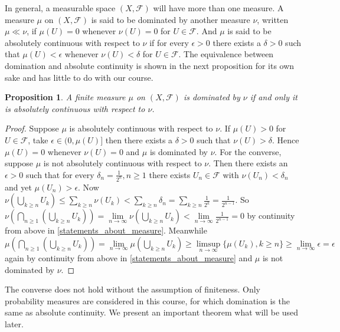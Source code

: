 \documentclass[12pt]{amsart}
\newtheorem{proposition}[theorem]{Proposition}
\theoremstyle{definition}
\begin{document}
In general, a measurable space $(X, \mathcal{F})$ will have more than one measure. A measure $\mu$ on $(X, \mathcal{F})$ is said to be dominated by another measure $\nu$, written $\mu \ll \nu$, if $\mu(U) = 0$ whenever $\nu(U) = 0$ for $U \in \mathcal{F}$. And $\mu$ is said to be absolutely continuous with respect to $\nu$ if for every $\epsilon > 0$ there exists a $\delta > 0$ such that $\mu(U) < \epsilon$ whenever $\nu(U) < \delta$ for $U \in \mathcal{F}$. The equivalence between domination and absolute continuity is shown in the next proposition for its own sake and has little to do with our course.

\begin{proposition} A finite measure $\mu$ on $(X, \mathcal{F})$ is dominated by $\nu$ if and only it is absolutely continuous with respect to $\nu$.
\end{proposition}
\begin{proof} Suppose $\mu$ is absolutely continuous with respect to $\nu$. If $\mu(U) > 0$ for $U \in \mathcal{F}$, take $\epsilon \in (0, \mu(U)]$ then there exists a $\delta > 0$ such that $\nu(U) > \delta$. Hence $\mu(U) = 0$ whenever $\nu(U) = 0$ and $\mu$ is dominated by $\nu$. For the converse, suppose $\mu$ is not absolutely continuous with respect to $\nu$. Then there exists an $\epsilon > 0$ such that for every $\delta_n = \frac{1}{2^n}, n \geq 1$ there exists $U_n \in \mathcal{F}$ with $\nu(U_n) < \delta_n$ and yet $\mu(U_n) > \epsilon$. Now $\nu(\bigcup\limits_{k \geq n} U_k) \leq \sum\limits_{k \geq n} \nu(U_k) < \sum\limits_{k \geq n} \delta_n = \sum\limits_{k \geq n} \frac{1}{2^k} = \frac{1}{2^{n-1}}$. So $\nu(\bigcap\limits_{n \geq 1} (\bigcup\limits_{k \geq n} U_k)) = \lim\limits_{n \to \infty} \nu(\bigcup\limits_{k \geq n} U_k) < \lim\limits_{n \to \infty} \frac{1}{2^{n-1}} = 0$ by continuity from above in \ref{statements_about_measure}. Meanwhile $\mu(\bigcap\limits_{n \geq 1} (\bigcup\limits_{k \geq n} U_k)) = \lim\limits_{n \to \infty} \mu(\bigcup\limits_{k \geq n} U_k) \geq \limsup\limits_{n \to \infty} \{\mu(U_k), k \geq n\} \geq \lim\limits_{n \to \infty} \epsilon = \epsilon$ again by continuity from above in \ref{statements_about_measure} and $\mu$ is not dominated by $\nu$. 
\end{proof}

The converse does not hold without the assumption of finiteness. Only probability measures are considered in this course, for which domination is the same as absolute continuity. We present an important theorem what will be used later.
\end{document}
